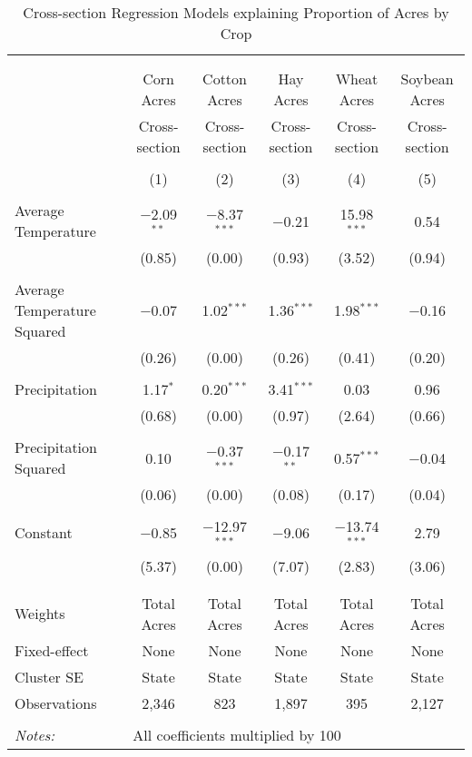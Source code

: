 \documentclass[10pt]{article}
\begin{document}
\newpage
\begin{table}[!htbp] \centering 
  \caption{Cross-section Regression Models explaining Proportion of Acres by Crop} 
  \label{} 
\footnotesize 
\begin{tabular}{@{\extracolsep{5pt}}lccccc} 
\\[-1.8ex]\hline 
\hline \\[-1.8ex] 
\\[-1.8ex] & Corn Acres & Cotton Acres & Hay Acres & Wheat Acres & Soybean Acres \\ 
 & Cross-section & Cross-section & Cross-section & Cross-section & Cross-section \\ 
\\[-1.8ex] & (1) & (2) & (3) & (4) & (5)\\ 
\hline \\[-1.8ex] 
 Average Temperature & $-$2.09$^{**}$ & $-$8.37$^{***}$ & $-$0.21 & 15.98$^{***}$ & 0.54 \\ 
  & (0.85) & (0.00) & (0.93) & (3.52) & (0.94) \\ 
  & & & & & \\ 
 Average Temperature Squared & $-$0.07 & 1.02$^{***}$ & 1.36$^{***}$ & 1.98$^{***}$ & $-$0.16 \\ 
  & (0.26) & (0.00) & (0.26) & (0.41) & (0.20) \\ 
  & & & & & \\ 
 Precipitation & 1.17$^{*}$ & 0.20$^{***}$ & 3.41$^{***}$ & 0.03 & 0.96 \\ 
  & (0.68) & (0.00) & (0.97) & (2.64) & (0.66) \\ 
  & & & & & \\ 
 Precipitation Squared & 0.10 & $-$0.37$^{***}$ & $-$0.17$^{**}$ & 0.57$^{***}$ & $-$0.04 \\ 
  & (0.06) & (0.00) & (0.08) & (0.17) & (0.04) \\ 
  & & & & & \\ 
 Constant & $-$0.85 & $-$12.97$^{***}$ & $-$9.06 & $-$13.74$^{***}$ & 2.79 \\ 
  & (5.37) & (0.00) & (7.07) & (2.83) & (3.06) \\ 
  & & & & & \\ 
\hline \\[-1.8ex] 
Weights & Total Acres & Total Acres & Total Acres & Total Acres & Total Acres \\ 
Fixed-effect & None & None & None & None & None \\ 
Cluster SE & State & State & State & State & State \\ 
Observations & 2,346 & 823 & 1,897 & 395 & 2,127 \\ 
\hline 
\hline \\[-1.8ex] 
\textit{Notes:} & \multicolumn{5}{l}{All coefficients multiplied by 100} \\ 
\end{tabular} 
\end{table} 
\end{document}
